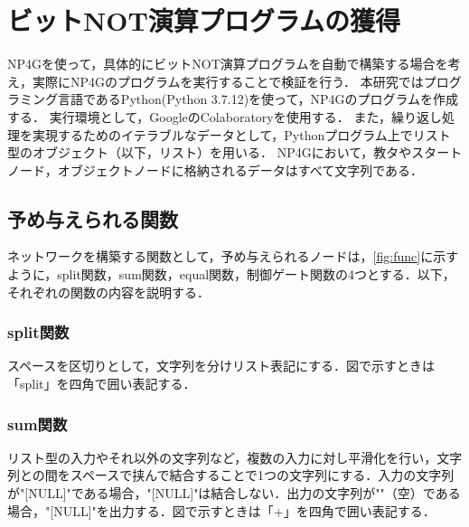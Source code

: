 \documentclass[exploratorypaper]{jsaiart} %
\begin{document}
\section{ビットNOT演算プログラムの獲得}
NP4Gを使って，具体的にビットNOT演算プログラムを自動で構築する場合を考え，実際にNP4Gのプログラムを実行することで検証を行う．
本研究ではプログラミング言語であるPython(Python 3.7.12)を使って，NP4Gのプログラムを作成する．
実行環境として，GoogleのColaboratoryを使用する．
また，繰り返し処理を実現するためのイテラブルなデータとして，Pythonプログラム上でリスト型のオブジェクト（以下，リスト）を用いる．
NP4Gにおいて，教タやスタートノード，オブジェクトノードに格納されるデータはすべて文字列である．

\subsection{予め与えられる関数}
ネットワークを構築する関数として，予め与えられるノードは，\ref{fig:func}に示すように，split関数，sum関数，equal関数，制御ゲート関数の4つとする．以下，それぞれの関数の内容を説明する．
\subsubsection{split関数}
スペースを区切りとして，文字列を分けリスト表記にする．図で示すときは「split」を四角で囲い表記する．


\subsubsection{sum関数}
リスト型の入力やそれ以外の文字列など，複数の入力に対し平滑化を行い，文字列との間をスペースで挟んで結合することで1つの文字列にする．入力の文字列が"[NULL]"である場合，"[NULL]"は結合しない．出力の文字列が""（空）である場合，"[NULL]"を出力する．図で示すときは「+」を四角で囲い表記する．
\end{document}
